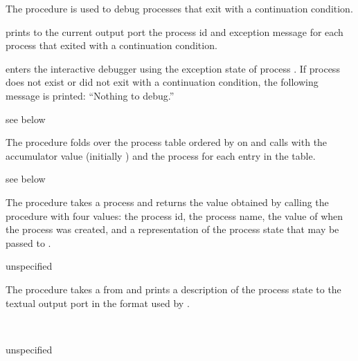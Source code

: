 The  procedure is used to debug processes that exit with a
continuation condition.

 prints to the current output port the process id and
exception message for each process that exited with a continuation
condition.

 enters the interactive debugger using the
exception state of process . If process  does not
exist or did not exit with a continuation condition, the following
message is printed: ``Nothing to debug.''

\begin{procedure}
\end{procedure}
\returns{} see below

The  procedure folds over the process table
ordered by  on  and calls 
with the accumulator value (initially ) and the process
for each entry in the table.

\begin{procedure}
\end{procedure}
\returns{} see below

The  procedure takes a process 
and returns the value obtained by calling the procedure 
with four values:
the process id,
the process name,
the value of  when the process was created,
and a representation of the process state
that may be passed to .

\begin{procedure}
\end{procedure}
\returns{} unspecified

The  procedure takes a  from
 and prints a description of the process state
to the textual output port  in the format used by .

\begin{procedure}
  \\
  \strut
\end{procedure}
\returns{} unspecified

